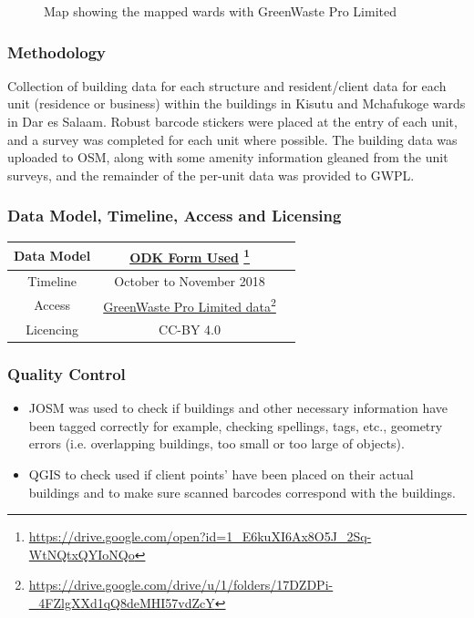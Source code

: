 \documentclass[a4paper,12pt,twoside]{article}
\begin{document}
\begin{figure}[h]
  \color{RHgreen}\caption{Map showing the mapped wards with GreenWaste Pro Limited}
  \centering
\end{figure}

\subsubsection{Methodology}

Collection of building data for each structure and resident/client data for each unit (residence or business) within the buildings in Kisutu and Mchafukoge wards in Dar es Salaam. Robust barcode stickers were placed at the entry of each unit, and a survey was completed for each unit where possible. The building data was uploaded to OSM, along with some amenity information gleaned from the unit surveys, and the remainder of the per-unit data was provided to GWPL.

\medskip
\subsubsection{Data Model, Timeline, Access and Licensing}
\begin{center}
\begin{tabular}{|c|c|c|}  
 \hline
Data Model &
       \href{https://drive.google.com/open?id=1_E6kuXI6Ax8O5J_2Sq-WtNQtxQYIoNQo}{ODK Form Used} \footnote{\url{https://drive.google.com/open?id=1_E6kuXI6Ax8O5J_2Sq-WtNQtxQYIoNQo}} \\
 \hline
  Timeline  &  October to November 2018 \\
\hline  
 Access  & 
    \href{https://drive.google.com/drive/u/1/folders/17DZDPi-_4FZlgXXd1qQ8deMHI57vdZcY}{GreenWaste Pro Limited data}\footnote{\url{https://drive.google.com/drive/u/1/folders/17DZDPi-_4FZlgXXd1qQ8deMHI57vdZcY}} \\
   
\hline 
    Licencing & CC-BY 4.0 \\
\hline
\end{tabular}
\end{center}

\subsubsection{Quality Control}
\begin{itemize}
    \item JOSM was used to check if buildings and other necessary information have been tagged correctly for example, checking spellings, tags, etc., geometry errors (i.e. overlapping buildings, too small or too large of objects). 
     \item QGIS to check used if client points' have been placed on their actual buildings and to make sure scanned barcodes correspond with the buildings.
\end{itemize}
\end{document}
